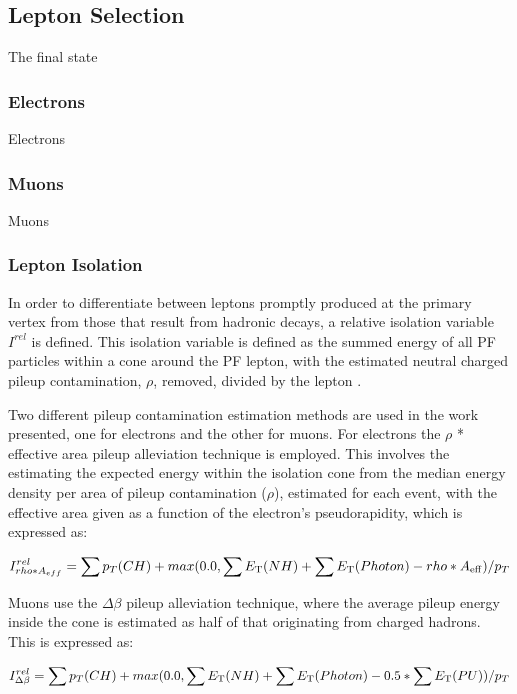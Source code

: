 \subsection{Lepton Selection}
The final state 
\subsubsection{Electrons}
Electrons
\subsubsection{Muons}
Muons
\subsubsection{Lepton Isolation}
In order to differentiate between leptons promptly produced at the primary vertex from those that result from hadronic decays, a relative isolation variable $I^{rel}$ is defined.
This isolation variable is defined as the summed energy of all PF particles within a cone around the PF lepton, with the estimated neutral charged pileup contamination, $\rho$, removed, divided by the lepton \pT.

Two different pileup contamination estimation methods are used in the work presented, one for electrons and the other for muons.
For electrons the $\rho$ * effective area pileup alleviation technique is employed.
This involves the estimating the expected energy within the isolation cone from the median energy density per area of pileup contamination ($\rho$), estimated for each event, with the effective area given as a function of the electron's pseudorapidity, which is expressed as: 

\begin{equation}
I^{rel}_{rho * A_{eff}} = \sum p_T(CH) + max (0.0, \sum E_{\rm T}(NH) + \sum E_{\rm T}(Photon) -rho*A_{\rm eff} )/p_T \\
\end{equation}\label{eq:rhoEffA}

Muons use the $\Delta\beta$ pileup alleviation technique, where the average pileup energy inside the cone is estimated as half of that originating from charged hadrons.
This is expressed as:

\begin{equation}
I^{rel}_{\Delta\beta} = \sum p_T(CH) + max (0.0, \sum E_{\rm T}(NH) + \sum E_{\rm T}(Photon) - 0.5 * \sum E_{\rm T}(PU))/p_T \\
\end{equation}\label{eq:deltaBeta}

